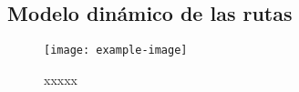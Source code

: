 \subsection{Modelo dinámico de las rutas}

\lipsum[1]

\begin{figure}[H]
	\centering
	\texttt{[image: example-image]}
	\centering\caption{xxxxx}
	\label{fig:XXXX}
\end{figure}

\lipsum[1]